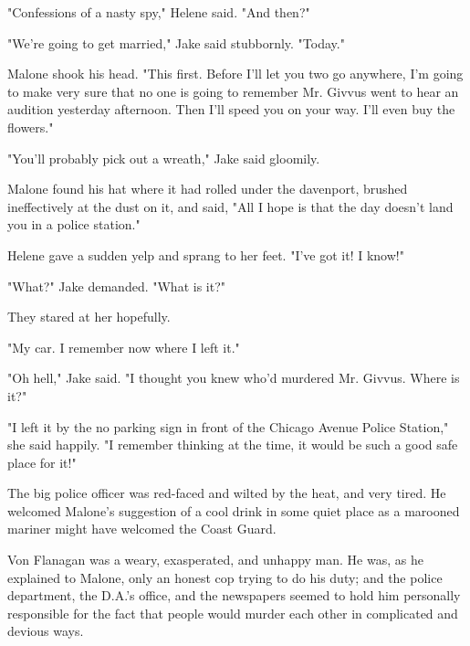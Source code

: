 \documentclass{novel}
\begin{document}
"Confessions of a nasty spy," Helene said. "And then?"

"We're going to get married," Jake said stubbornly. "Today."

Malone shook his head. "This first. Before I'll let you two go anywhere, I'm going to make very sure that no one is going to remember Mr. Givvus went to hear an audition yesterday afternoon. Then I'll speed you on your way. I'll even buy the flowers."

"You'll probably pick out a wreath," Jake said gloomily.

Malone found his hat where it had rolled under the davenport, brushed ineffectively at the dust on it, and said, "All I hope is that the day doesn't land you in a police station."

Helene gave a sudden yelp and sprang to her feet. "I've got it! I know!"

"What?" Jake demanded. "What is it?"

They stared at her hopefully.

"My car. I remember now where I left it."

"Oh hell," Jake said. "I thought you knew who'd murdered Mr. Givvus. Where is it?"

"I left it by the no parking sign in front of the Chicago Avenue Police Station," she said happily. "I remember thinking at the time, it would be such a good safe place for it!"

\vspace{2\nbs}
\clearpage
\thispagestyle{empty}

\begin{ChapterStart}
\vspace{3\nbs}
\end{ChapterStart}

The big police officer was red-faced and wilted by the heat, and very tired. He welcomed Malone's suggestion of a cool drink in some quiet place as a marooned mariner might have welcomed the Coast Guard.

Von Flanagan was a weary, exasperated, and unhappy man. He was, as he explained to Malone, only an honest cop trying to do his duty; and the police department, the D.A.'s office, and the newspapers seemed to hold him personally responsible for the fact that people would murder each other in complicated and devious ways.
\end{document}
